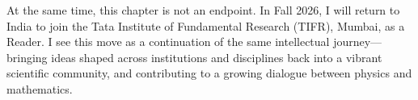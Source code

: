 \documentclass[11pt, oneside]{article}
\begin{document}
At the same time, this chapter is not an endpoint. In Fall 2026, I will return to India to join the Tata
Institute of Fundamental Research (TIFR), Mumbai, as a Reader. I see this move as a continuation of the
same intellectual journey—bringing ideas shaped across institutions and disciplines back into a vibrant
scientific community, and contributing to a growing dialogue between physics and mathematics.
\end{document}
